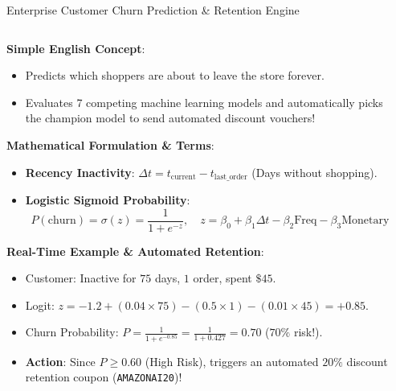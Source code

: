 \documentclass[10pt]{beamer}
\begin{document}
\begin{frame}[fragile]{Enterprise Customer Churn Prediction \& Retention Engine}
\begin{columns}[T]
    \begin{column}{0.50\textwidth}
        {\color{brandred}\textbf{Simple English Concept}}:
        \begin{itemize}\scriptsize
            \item Predicts which shoppers are about to leave the store forever.
            \item Evaluates 7 competing machine learning models and automatically picks the champion model to send automated discount vouchers!
        \end{itemize}
        {\color{brandorange}\textbf{Mathematical Formulation \& Terms}}:
        \begin{itemize}\scriptsize
            \item \textbf{Recency Inactivity}: $\Delta t = t_{\text{current}} - t_{\text{last\_order}}$ (Days without shopping).
            \item \textbf{Logistic Sigmoid Probability}:
            $$P(\text{churn}) = \sigma(z) = \frac{1}{1 + e^{-z}}, \quad z = \beta_0 + \beta_1 \Delta t - \beta_2 \text{Freq} - \beta_3 \text{Monetary}$$
        \end{itemize}
        {\color{brandred}\textbf{Real-Time Example \& Automated Retention}}:
        \begin{itemize}\scriptsize
            \item Customer: Inactive for $75$ days, $1$ order, spent $\$45$.
            \item Logit: $z = -1.2 + (0.04 \times 75) - (0.5 \times 1) - (0.01 \times 45) = \mathbf{+0.85}$.
            \item Churn Probability: $P = \frac{1}{1 + e^{-0.85}} = \frac{1}{1 + 0.427} = \mathbf{0.70}$ ($70\%$ risk!).
            \item \textbf{Action}: Since $P \ge 0.60$ (High Risk), triggers an automated $20\%$ discount retention coupon (\texttt{AMAZONAI20})!
        \end{itemize}
    \end{column}%
    \begin{column}{0.46\textwidth}
\begin{lstlisting}[language=Python]

\end{lstlisting}
\end{column}
\end{columns}
\end{frame}
\end{document}
